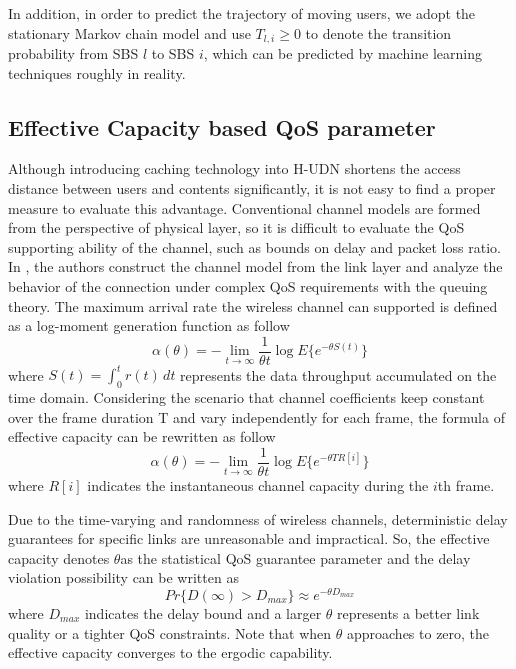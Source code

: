 \documentclass[conference]{IEEEtran}
\begin{document}
In addition, in order to predict the trajectory of moving users, we adopt the stationary Markov chain model and use $T_{l,i}\ge 0$ to denote the transition probability from SBS $l$ to SBS $i$, which can be predicted by machine learning techniques roughly in reality.

\subsection{Effective Capacity based QoS parameter}
Although introducing caching technology into H-UDN shortens the access distance between users and contents significantly, it is not easy to find a proper measure to evaluate this advantage. Conventional channel models are formed from the perspective of physical layer, so it is difficult to evaluate the QoS supporting ability of the channel, such as bounds on delay and packet loss ratio. In \cite{1210731}, the authors construct the channel model from the link layer and analyze the behavior of the connection under complex QoS requirements with the queuing theory. The maximum arrival rate the wireless channel can supported is defined as a log-moment generation function as follow
\begin{equation}
\alpha(\theta)=-\lim_{t \to \infty}\frac{1}{\theta t}\log E\{e^{-\theta S(t)}\}
\end{equation}
where $S(t)=\int_{0}^{t} r(t)\, dt$ represents the data throughput accumulated on the time domain. Considering the scenario that channel coefficients keep constant over the frame duration T and vary independently for each frame, the formula of effective capacity can be rewritten as follow
\begin{equation}
\alpha(\theta)=-\lim_{t \to \infty}\frac{1}{\theta t}\log E\{e^{-\theta TR[i]}\}
\end{equation}
where $R[i]$ indicates the instantaneous channel capacity during the $i$th frame.

Due to the time-varying and randomness of wireless channels, deterministic delay guarantees for specific links are unreasonable and impractical. So, the effective capacity denotes
$\theta$as the statistical QoS guarantee parameter and the delay violation possibility can be written as
\begin{equation}
Pr\{D(\infty)>D_{max}\}\approx e^{-\theta D_{max}}
\end{equation}
where $D_{max}$ indicates the delay bound and a larger $\theta$ represents a better link quality or a tighter QoS constraints. Note that when $\theta$ approaches to zero, the effective capacity converges to the ergodic capability.
\end{document}

